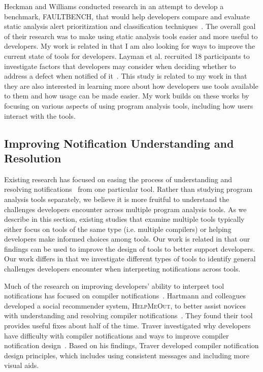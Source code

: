 \documentclass{llncs}
\begin{document}
Heckman and Williams conducted research in an attempt to develop a benchmark,
FAULTBENCH, that would help developers compare and evaluate static analysis
alert prioritization and classification techniques~\cite{Heckman:2008:Faultbench}. 
The overall goal of their research was to make using static analysis tools easier and more useful to developers.
My work is related in that I am also looking for ways to improve the current state of tools for developers. 
Layman et al. recruited 18 participants to investigate factors that developers may consider when deciding whether to
address a defect when notified of it~\cite{Layman:2007:FaultFix}. This study
is related to my work in that they are also interested in learning more about how developers use tools available to them 
and how usage can be made easier.  My work builds on these works by focusing on various
aspects of using program analysis tools, including how users interact with the
tools.

\subsection{Improving Notification Understanding and Resolution}

Existing research has focused on easing the process of understanding and resolving notifications~\cite{Hartmann:2010:Suggestions,Mucslu:2012:Speculative,pham2015automatically,fritz2014developers} from one particular tool.
Rather than studying program analysis tools separately, we believe it is more fruitful to understand the challenges developers encounter across multiple program analysis tools.
As we describe in this section,
existing studies that examine multiple tools typically either focus on tools of the same type (i.e. multiple compilers) 
or helping developers make informed choices among tools. 
Our work is related in that our findings can be used to improve the design of tools to better support developers.
Our work differs in that we investigate different types of tools to identify general challenges developers encounter when interpreting notifications across tools. 

Much of the research on improving developers' ability to interpret tool notifications has focused on compiler notifications~\cite{Hartmann:2010:Suggestions,Traver:2010:Messages,barik14}. 
Hartmann and colleagues developed a social recommender system, \textsc{HelpMeOut}, to better assist novices with understanding and resolving compiler notifications~\cite{Hartmann:2010:Suggestions}. They found their tool provides useful fixes about half of the time. Traver investigated why developers have difficulty with compiler notifications and ways to improve compiler notification design~\cite{Traver:2010:Messages}. Based on his findings, Traver developed compiler notification design principles, which includes using consistent messages and including more visual aids.
\end{document}
